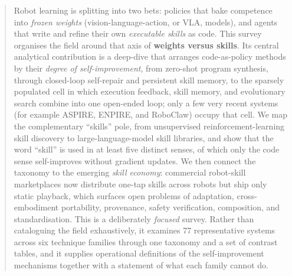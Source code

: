 \begin{abstract}
Robot learning is splitting into two bets: policies that bake competence into \emph{frozen
weights} (vision-language-action, or VLA, models), and agents that write and refine their own
\emph{executable skills} as code. This survey organises the field around that axis of
\textbf{weights versus skills}. Its central analytical contribution is a deep-dive that arranges
code-as-policy methods by their \emph{degree of self-improvement}, from zero-shot program
synthesis, through closed-loop self-repair and persistent skill memory, to the sparsely
populated cell in which execution feedback, skill memory, and evolutionary search combine into
one open-ended loop; only a few very recent systems (for example ASPIRE, ENPIRE, and RoboClaw)
occupy that cell. We map the complementary ``skills'' pole, from unsupervised
reinforcement-learning skill discovery to large-language-model skill libraries, and show that
the word ``skill'' is used in at least five distinct senses, of which only the code sense
self-improves without gradient updates. We then connect the taxonomy to the emerging
\emph{skill economy}: commercial robot-skill marketplaces now distribute one-tap skills across
robots but ship only static playback, which surfaces open problems of adaptation,
cross-embodiment portability, provenance, safety verification, composition, and
standardisation. This is a deliberately \emph{focused} survey. Rather than cataloguing the
field exhaustively, it examines 77 representative systems across six technique families through
one taxonomy and a set of contrast tables, and it supplies operational definitions of the
self-improvement mechanisms together with a statement of what each family cannot do.
\end{abstract}
